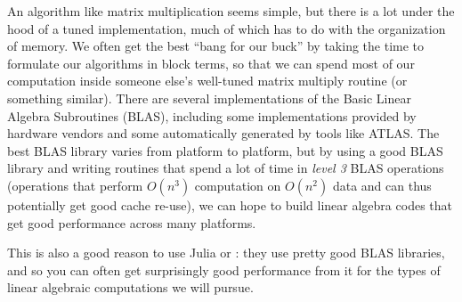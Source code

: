 \documentclass[12pt, leqno]{article}
\begin{document}
An algorithm like matrix multiplication seems simple, but there is a
lot under the hood of a tuned implementation, much of which has to do
with the organization of memory.  We often get the best ``bang for our
buck'' by taking the time to formulate our algorithms in block terms,
so that we can spend most of our computation inside someone else's
well-tuned matrix multiply routine (or something similar).  There are
several implementations of the Basic Linear Algebra Subroutines
(BLAS), including some implementations provided by hardware vendors
and some automatically generated by tools like ATLAS.  The best BLAS
library varies from platform to platform, but by using a good BLAS
library and writing routines that spend a lot of time in {\em level 3}
BLAS operations (operations that perform $O(n^3)$ computation on
$O(n^2)$ data and can thus potentially get good cache re-use), we can
hope to build linear algebra codes that get good performance across
many platforms.

This is also a good reason to use Julia or \matlab:
they use pretty good BLAS libraries,
and so you can often get surprisingly good performance from it for the types
of linear algebraic computations we will pursue.



\end{document}
